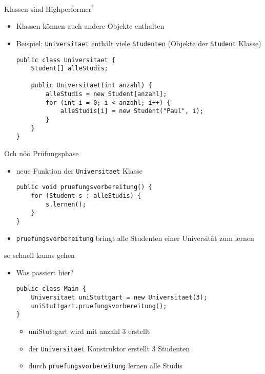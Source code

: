 \documentclass{../../presentation}
\begin{document}
\begin{frame}[fragile]{Klassen sind Highperformer\textsuperscript{²}}

	\begin{itemize}
		\item<2-> Klassen können auch andere Objekte enthalten
		\item<3-> Beispiel: \texttt{Universitaet} enthält viele \texttt{Studenten} (Objekte der \texttt{Student} Klasse)
		      \begin{verbatim}
public class Universitaet {
    Student[] alleStudis;

    public Universitaet(int anzahl) {
        alleStudis = new Student[anzahl];
        for (int i = 0; i < anzahl; i++) {
            alleStudis[i] = new Student("Paul", i);
        }
    }
}
\end{verbatim}
	\end{itemize}
\end{frame}


\begin{frame}[fragile]{Och nöö Prüfungsphase}

	\begin{itemize}
		\item<2-> neue Funktion der \texttt{Universitaet} Klasse
		      \begin{verbatim}
public void pruefungsvorbereitung() {
    for (Student s : alleStudis) {
        s.lernen();
    }
}
\end{verbatim}
		\item<3-> \texttt{pruefungsvorbereitung} bringt alle Studenten einer Universität zum lernen
	\end{itemize}
\end{frame}

\begin{frame}[fragile]{so schnell kanns gehen}

	\begin{itemize}
		\item<2-> Was passiert hier?
		      \begin{verbatim}
public class Main {
    Universitaet uniStuttgart = new Universitaet(3);
	uniStuttgart.pruefungsvorbereitung();
}
\end{verbatim}
		      \begin{itemize}
			      \item<4->[\textbullet]uniStuttgart wird mit anzahl 3 erstellt
			      \item<5->[\textbullet]der \texttt{Universitaet} Konstruktor erstellt 3 Studenten
			      \item<6->[\textbullet]durch \texttt{pruefungsvorbereitung} lernen alle Studis
		      \end{itemize}
	\end{itemize}
\end{frame}
\end{document}

